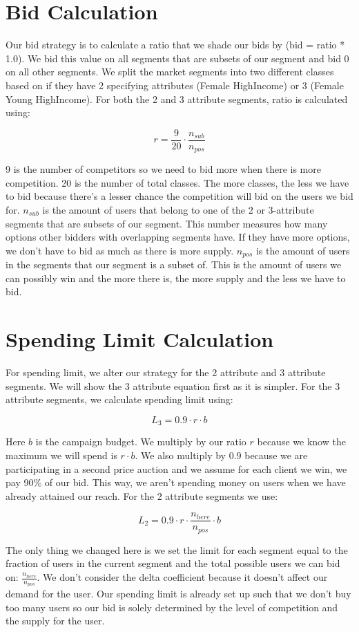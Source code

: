 \documentclass[12pt,letterpaper]{article}
\begin{document}
\section*{Bid Calculation}
Our bid strategy is to calculate a ratio that we shade our bids by (bid = ratio * 1.0). 
We bid this value on all segments that are subsets of our segment and bid 0 on
all other segments. 
We split the market segments into two different classes based on if they have
2 specifying attributes (Female HighIncome) or 3 (Female Young HighIncome).
For both the 2 and 3 attribute segments, ratio is calculated using:

$$r=\frac{9}{20}\cdot \frac{n_{sub}}{n_{pos}}$$

9 is the number of competitors so we need to bid more when there is more
competition. 20 is the number of total classes. The more classes, the less
we have to bid because there's a lesser chance the competition will bid 
on the users we bid for. $n_{sub}$ is the amount of users that belong to 
one of the 2 or 3-attribute segments that are subsets of our segment. This number
measures how many options other bidders with overlapping segments have. If
they have more options, we don't have to bid as much as there is more supply. 
$n_{pos}$ is the amount of users in the segments that our segment is a subset of. 
This is the amount of users we can possibly win and the more there is, the more
supply and the less we have to bid. 

\section*{Spending Limit Calculation}
For spending limit, we alter our strategy for the 2 attribute and 3 attribute 
segments. We will show the 3 attribute equation first as it is simpler.
For the 3 attribute segments, we calculate spending limit using:

$$L_3 = 0.9\cdot r\cdot b$$

Here $b$ is the campaign budget. We multiply by our ratio $r$ because we 
know the maximum we will spend is $r\cdot b$. We also multiply by 0.9 
because we are participating in a second price auction and we assume for each
client we win, we pay 90\% of our bid. This way, we aren't spending money on
users when we have already attained our reach. For the 2 attribute segments we use:

$$L_2 = 0.9\cdot r\cdot \frac{n_{here}}{n_{pos}}\cdot b$$

The only thing we changed here is we set the limit for each segment equal to
the fraction of users in the current segment and the total possible users
we can bid on: $\frac{n_{here}}{n_{pos}}$. We don't consider the delta coefficient because it doesn't affect our demand for the user.
Our spending limit is already set up such that we don't buy too many users so our bid is 
solely determined by the level of competition and the supply for the user. 
\end{document}
